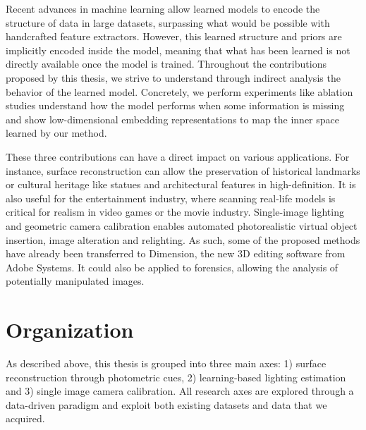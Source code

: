 Recent advances in machine learning allow learned models to encode the structure of data in large datasets, surpassing what would be possible with handcrafted feature extractors. However, this learned structure and priors are implicitly encoded inside the model, meaning that what has been learned is not directly available once the model is trained. Throughout the contributions proposed by this thesis, we strive to understand through indirect analysis the behavior of the learned model. Concretely, we perform experiments like ablation studies understand how the model performs when some information is missing and show low-dimensional embedding representations to map the inner space learned by our method. 


These three contributions can have a direct impact on various applications. For instance, surface reconstruction can allow the preservation of historical landmarks or cultural heritage like statues and architectural features in high-definition. It is also useful for the entertainment industry, where scanning real-life models is critical for realism in video games or the movie industry. Single-image lighting and geometric camera calibration enables automated photorealistic virtual object insertion, image alteration and relighting. As such, some of the proposed methods have already been transferred to Dimension, the new 3D editing software from Adobe Systems. It could also be applied to forensics, allowing the analysis of potentially manipulated images. 

\section*{Organization}

As described above, this thesis is grouped into three main axes: 1) surface reconstruction through photometric cues, 2) learning-based lighting estimation and 3) single image camera calibration. All research axes are explored through a data-driven paradigm and exploit both existing datasets and data that we acquired. 

